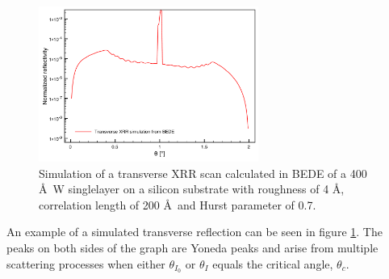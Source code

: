 \begin{figure}[!ht] %
	\centering
		\includegraphics[height=2in]{figures/xray_app/transverse.pdf}
	\caption{Simulation of a transverse XRR scan calculated in BEDE of a 400 \AA\ W singlelayer on a silicon substrate with roughness of 4 \AA, correlation length of 200 \AA\ and Hurst parameter of 0.7. }
	\label{fig:transverse}
\end{figure}

An example of a simulated transverse reflection can be seen in figure \ref{fig:transverse}. The peaks on both sides of the graph are Yoneda peaks\cite{Yoneda:1963p5493} and arise from multiple scattering processes when either $\theta_{I_0}$ or $\theta_I$ equals the critical angle, $\theta_c$.
